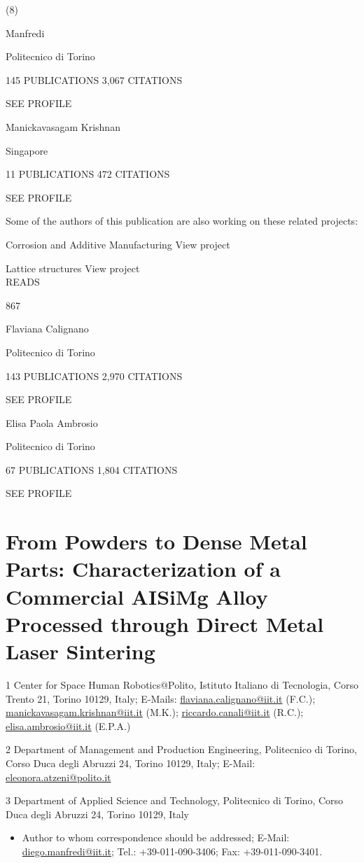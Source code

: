 \documentclass[10pt]{article}
\begin{document}
(8)

Manfredi

Politecnico di Torino

145 PUBLICATIONS 3,067 CITATIONS

SEE PROFILE

Manickavasagam Krishnan

Singapore

11 PUBLICATIONS 472 CITATIONS

SEE PROFILE

Some of the authors of this publication are also working on these related projects:

Corrosion and Additive Manufacturing View project

Lattice structures View project\\
READS

867

Flaviana Calignano

Politecnico di Torino

143 PUBLICATIONS 2,970 CITATIONS

SEE PROFILE

Elisa Paola Ambrosio

Politecnico di Torino

67 PUBLICATIONS 1,804 CITATIONS

SEE PROFILE

\section*{From Powders to Dense Metal Parts: Characterization of a Commercial AISiMg Alloy Processed through Direct Metal Laser Sintering }
1 Center for Space Human Robotics@Polito, Istituto Italiano di Tecnologia, Corso Trento 21, Torino 10129, Italy; E-Mails: \href{mailto:flaviana.calignano@iit.it}{flaviana.calignano@iit.it} (F.C.); \href{mailto:manickavasagam.krishnan@iit.it}{manickavasagam.krishnan@iit.it} (M.K.); \href{mailto:riccardo.canali@iit.it}{riccardo.canali@iit.it} (R.C.); \href{mailto:elisa.ambrosio@iit.it}{elisa.ambrosio@iit.it} (E.P.A.)

2 Department of Management and Production Engineering, Politecnico di Torino, Corso Duca degli Abruzzi 24, Torino 10129, Italy; E-Mail: \href{mailto:eleonora.atzeni@polito.it}{eleonora.atzeni@polito.it}

3 Department of Applied Science and Technology, Politecnico di Torino, Corso Duca degli Abruzzi 24, Torino 10129, Italy

\begin{itemize}
  \item Author to whom correspondence should be addressed; E-Mail: \href{mailto:diego.manfredi@iit.it}{diego.manfredi@iit.it}; Tel.: +39-011-090-3406; Fax: +39-011-090-3401.
\end{itemize}
\end{document}
